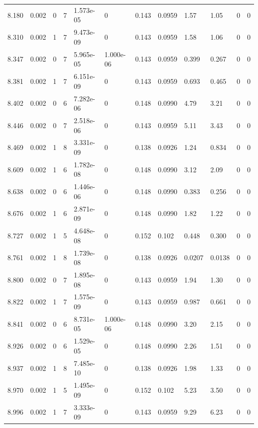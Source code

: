 \documentclass[preview]{standalone}
\begin{document}
{{{{{\begin{tabular}{L{1.2cm}C{1.2cm} C{0.3cm}C{0.5cm} C{1.4cm}C{1.4cm} C{1.4cm}C{1.4cm} C{1.6cm}C{1.6cm} C{1.6cm}C{1.6cm}}
  8.180  &  0.002  & 0     &  7 &  1.573e-05  & 0  &  0.143&   0.0959& 1.57 & 1.05   &  0 & 0  \\ 
  8.310  &  0.002  & 1     &  7 &  9.473e-09  & 0  &  0.143&   0.0959& 1.58 & 1.06   &  0 & 0  \\ 
  8.347  &  0.002  & 0     &  7 &  5.965e-05  & 1.000e-06  &  0.143&   0.0959& 0.399 & 0.267   &  0 & 0  \\ 
  8.381  &  0.002  & 1     &  7 &  6.151e-09  & 0  &  0.143&   0.0959& 0.693 & 0.465   &  0 & 0  \\ 
  8.402  &  0.002  & 0     &  6 &  7.282e-06  & 0  &  0.148&   0.0990& 4.79 & 3.21   &  0 & 0  \\ 
  8.446  &  0.002  & 0     &  7 &  2.518e-06  & 0  &  0.143&   0.0959& 5.11 & 3.43   &  0 & 0  \\ 
  8.469  &  0.002  & 1     &  8 &  3.331e-09  & 0  &  0.138&   0.0926& 1.24 & 0.834   &  0 & 0  \\ 
  8.609  &  0.002  & 1     &  6 &  1.782e-08  & 0  &  0.148&   0.0990& 3.12 & 2.09   &  0 & 0  \\ 
  8.638  &  0.002  & 0     &  6 &  1.446e-06  & 0  &  0.148&   0.0990& 0.383 & 0.256   &  0 & 0  \\ 
  8.676  &  0.002  & 1     &  6 &  2.871e-09  & 0  &  0.148&   0.0990& 1.82 & 1.22   &  0 & 0  \\ 
  8.727  &  0.002  & 1     &  5 &  4.648e-08  & 0  &  0.152&   0.102& 0.448 & 0.300   &  0 & 0  \\ 
  8.761  &  0.002  & 1     &  8 &  1.739e-08  & 0  &  0.138&   0.0926& 0.0207 & 0.0138   &  0 & 0  \\ 
  8.800  &  0.002  & 0     &  7 &  1.895e-08  & 0  &  0.143&   0.0959& 1.94 & 1.30   &  0 & 0  \\ 
  8.822  &  0.002  & 1     &  7 &  1.575e-09  & 0  &  0.143&   0.0959& 0.987 & 0.661   &  0 & 0  \\ 
  8.841  &  0.002  & 0     &  6 &  8.731e-05  & 1.000e-06  &  0.148&   0.0990& 3.20 & 2.15   &  0 & 0  \\ 
  8.926  &  0.002  & 0     &  6 &  1.529e-05  & 0  &  0.148&   0.0990& 2.26 & 1.51   &  0 & 0  \\ 
  8.937  &  0.002  & 1     &  8 &  7.485e-10  & 0  &  0.138&   0.0926& 1.98 & 1.33   &  0 & 0  \\ 
  8.970  &  0.002  & 1     &  5 &  1.495e-09  & 0  &  0.152&   0.102& 5.23 & 3.50   &  0 & 0  \\ 
  8.996  &  0.002  & 1     &  7 &  3.333e-09  & 0  &  0.143&   0.0959& 9.29 & 6.23   &  0 & 0  \\ 

\end{tabular}}}}}}
\end{document}
